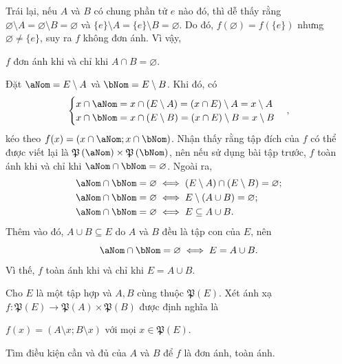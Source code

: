 Trái lại, nếu $A$ và $B$ có chung phần tử $e$ nào đó, thì dễ thấy rằng $\varnothing \setminus A = \varnothing \setminus B = \varnothing$ và $\{e\} \setminus A = \{e\} \setminus B = \varnothing$. Do đó, $f(\varnothing) = f(\{e\})$ nhưng $\varnothing \neq \{e\}$, suy ra $f$ không đơn ánh. Vì vậy, \begin{center}
   $f$ đơn ánh khi và chỉ khi $A \cap B = \varnothing$.
\end{center}

Đặt $\aNom = E \setminus A$ và $\bNom = E \setminus B$. Khi đó, có 
\begin{equation*}
   \begin{cases}
      x \cap \aNom = x \cap (E \setminus A) = (x \cap E) \setminus A = x \setminus A \\
      x \cap \bNom  = x \cap (E \setminus B)= (x \cap E) \setminus B = x \setminus B
   \end{cases},
\end{equation*}
kéo theo $f(x) = \left(x \cap \aNom; x \cap \bNom\right)$. Nhận thấy rằng tập đích của $f$ có thể được viết lại là $\mathfrak{P}\left(\aNom\right) \times \mathfrak{P}\left(\bNom\right)$, nên nếu sử dụng bài tập trước, $f$ toàn ánh khi và chỉ khi $\aNom \cap \bNom = \varnothing$. Ngoài ra, \begin{align*}
   \aNom \cap \bNom = \varnothing &\iff (E \setminus A) \cap (E \setminus B) = \varnothing; \\ 
   \aNom \cap \bNom = \varnothing &\iff E \setminus (A \cup B) = \varnothing; \\
   \aNom \cap \bNom = \varnothing &\iff E \subseteq A \cup B.
\end{align*}
Thêm vào đó, $A \cup B \subseteq E$ do $A$ và $B$ đều là tập con của $E$, nên \begin{equation*}
   \aNom \cap \bNom = \varnothing \iff E = A \cup B.
\end{equation*}
Vì thế, $f$ toàn ánh khi và chỉ khi $E = A \cup B$.

\exercise Cho $E$ là một tập hợp và $A, B$ cùng thuộc $\mathfrak{P}(E)$. Xét ánh xạ $f: \mathfrak{P}(E) \to \mathfrak{P}(A) \times \mathfrak{P}(B)$ được định nghĩa là \begin{center}
   $f(x) = (A \setminus x; B \setminus x)$ với mọi $x \in \mathfrak{P}(E)$.
\end{center}
Tìm điều kiện cần và đủ của $A$ và $B$ để $f$ là đơn ánh, toàn ánh.

\solution 

